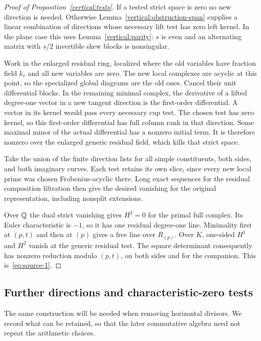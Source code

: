 \begin{proof}[Proof of Proposition~\ref{vertical:tests}]
If a tested strict space is zero no new direction is needed.
Otherwise Lemma~\ref{vertical:obstruction-span} supplies a
linear combination of directions whose necessary lift test has
zero left kernel.  In the plane case this uses
Lemma~\ref{vertical:parity}: $s$ is even and an alternating
matrix with $s/2$ invertible skew blocks is nonsingular.

Work in the enlarged residual ring, localized where the old
variables have fraction field $k_r$ and all new variables are
zero.  The new local complexes are acyclic at this point, so
the specialized global diagrams are the old ones.  Cancel their
unit differential blocks.  In the remaining minimal complex,
the derivative of a lifted degree-one vector in a new tangent
direction is the first-order differential.  A vector in its
kernel would pass every necessary cup test.  The chosen test
has zero kernel, so this first-order differential has full
column rank in that direction.  Some maximal minor of the
actual differential has a nonzero initial term.  It is
therefore nonzero over the enlarged generic residual field,
which kills that strict space.

Take the union of the finite direction lists for all simple
constituents, both sides, and both imaginary curves.  Each test
retains its own slice, since every new local prime was chosen
Frobenius-acyclic there.  Long exact sequences for the residual
composition filtration then give the desired vanishing for
the original representation, including nonsplit extensions.

Over $\mathbb Q$ the dual strict vanishing gives $H^2=0$ for the
primal full complex.  Its Euler characteristic is $-1$, so it
has one residual degree-one line.  Minimality first at
$(p,t)$ and then at $(p)$ gives a free line over $R_{(p)}$.
Over $K$, one-sided $H^1$ and $H^2$ vanish at the generic
residual test.  The square determinant consequently has
nonzero reduction modulo $(p,t)$, on both sides and for the
companion.  This is~\eqref{eq:source-1}.
\end{proof}

\subsection{Further directions and characteristic-zero tests}

The same construction will be needed when removing horizontal
divisors.  We record what can be retained, so that the later
commutative algebra need not repeat the arithmetic choices.

